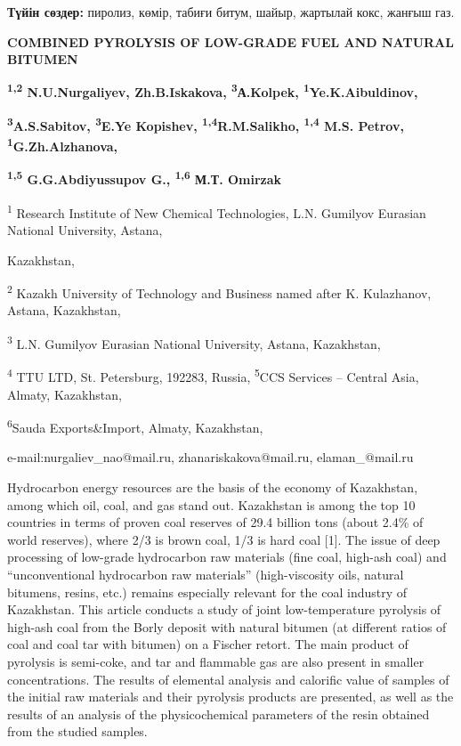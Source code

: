 {\bfseries Түйін сөздер:} пиролиз, көмір, табиғи битум, шайыр, жартылай
кокс, жанғыш газ.

{\bfseries COMBINED PYROLYSIS OF LOW-GRADE FUEL AND NATURAL BITUMEN}

{\bfseries \textsuperscript{1,2} N.U.Nurgaliyev, Zh.B.Iskakova,
\textsuperscript{3}А.Kolpek, \textsuperscript{1}Ye.K.Aibuldinov,}

{\bfseries \textsuperscript{3}A.S.Sabitov, \textsuperscript{3}E.Ye
Kopishev, \textsuperscript{1,4}R.M.Salikho, \textsuperscript{1,4} M.S.
Petrov, \textsuperscript{1}G.Zh.Alzhanova,}

{\bfseries \textsuperscript{1,5} G.G.Abdiyussupov G., \textsuperscript{1,6}
М.Т. Omirzak}

\textsuperscript{1} Research Institute of New Chemical Technologies,
L.N. Gumilyov Eurasian National University, Astana,

Kazakhstan,

\textsuperscript{2} Kazakh University of Technology and Business named
after K. Kulazhanov, Astana, Kazakhstan,

\textsuperscript{3} L.N. Gumilyov Eurasian National University, Astana,
Kazakhstan,

\textsuperscript{4} TTU LTD, St. Petersburg, 192283, Russia,
\textsuperscript{5}CCS Services -- Central Asia, Almaty, Kazakhstan,

\textsuperscript{6}Sauda Exports\&Import, Almaty, Kazakhstan,

e-mail:nurgaliev\_nao@mail.ru, zhanariskakova@mail.ru, elaman\_@mail.ru

Hydrocarbon energy resources are the basis of the economy of Kazakhstan,
among which oil, coal, and gas stand out. Kazakhstan is among the top 10
countries in terms of proven coal reserves of 29.4 billion tons (about
2.4\% of world reserves), where 2/3 is brown coal, 1/3 is hard coal
{[}1{]}. The issue of deep processing of low-grade hydrocarbon raw
materials (fine coal, high-ash coal) and ``unconventional hydrocarbon
raw materials'' (high-viscosity oils, natural bitumens, resins, etc.)
remains especially relevant for the coal industry of Kazakhstan. This
article conducts a study of joint low-temperature pyrolysis of high-ash
coal from the Borly deposit with natural bitumen (at different ratios of
coal and coal tar with bitumen) on a Fischer retort. The main product of
pyrolysis is semi-coke, and tar and flammable gas are also present in
smaller concentrations. The results of elemental analysis and calorific
value of samples of the initial raw materials and their pyrolysis
products are presented, as well as the results of an analysis of the
physicochemical parameters of the resin obtained from the studied
samples.

